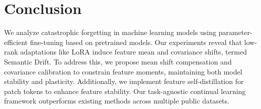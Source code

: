 \section{Conclusion}
We analyze catastrophic forgetting in machine learning models using parameter-efficient fine-tuning based on pretrained models. Our experiments reveal that low-rank adaptations like LoRA induce feature mean and covariance shifts, termed Semantic Drift. To address this, we propose mean shift compensation and covariance calibration to constrain feature moments, maintaining both model stability and plasticity. Additionally, we implement feature self-distillation for patch tokens to enhance feature stability. Our task-agnostic continual learning framework outperforms existing methods across multiple public datasets.
